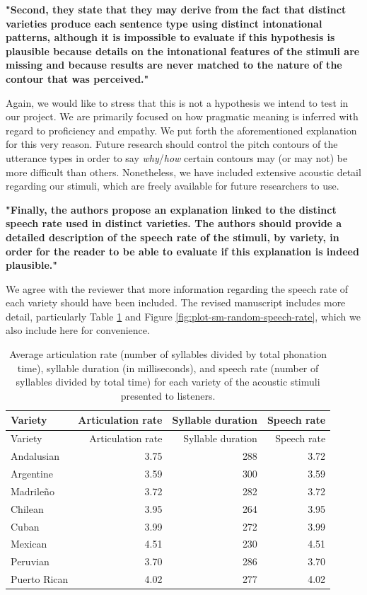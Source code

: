 \documentclass[]{article}
\begin{document}
\textbf{"Second, they state that they may derive from the fact that distinct varieties produce each sentence type using distinct intonational patterns, although it is impossible to evaluate if this hypothesis is plausible because details on the intonational features of the stimuli are missing and because results are never matched to the nature of the contour that was perceived."}

Again, we would like to stress that this is not a hypothesis we intend to test in our project.
We are primarily focused on how pragmatic meaning is inferred with regard to proficiency and empathy.
We put forth the aforementioned explanation for this very reason.
Future research should control the pitch contours of the utterance types in order to say \emph{why}/\emph{how} certain contours may (or may not) be more difficult than others.
Nonetheless, we have included extensive acoustic detail regarding our stimuli, which are freely available for future researchers to use.

\textbf{"Finally, the authors propose an explanation linked to the distinct speech rate used in distinct varieties. The authors should provide a detailed description of the speech rate of the stimuli, by variety, in order for the reader to be able to evaluate if this explanation is indeed plausible."}

We agree with the reviewer that more information regarding the speech rate of each variety should have been included.
The revised manuscript includes more detail, particularly Table \ref{tab:table-stimuli-sr} and Figure \ref{fig:plot-sm-random-speech-rate}, which we also include here for convenience.

\begin{longtable}[]{@{}lrrr@{}}
\caption{\label{tab:table-stimuli-sr}Average articulation rate (number of syllables divided by total
phonation time), syllable duration (in milliseconds), and speech rate (number
of syllables divided by total time) for each variety of the acoustic stimuli
presented to listeners.}\tabularnewline
\toprule()
Variety & Articulation rate & Syllable duration & Speech rate \\
\midrule()
\endfirsthead
\toprule()
Variety & Articulation rate & Syllable duration & Speech rate \\
\midrule()
\endhead
Andalusian & 3.75 & 288 & 3.72 \\
Argentine & 3.59 & 300 & 3.59 \\
Madrileño & 3.72 & 282 & 3.72 \\
Chilean & 3.95 & 264 & 3.95 \\
Cuban & 3.99 & 272 & 3.99 \\
Mexican & 4.51 & 230 & 4.51 \\
Peruvian & 3.70 & 286 & 3.70 \\
Puerto Rican & 4.02 & 277 & 4.02 \\
\bottomrule()
\end{longtable}
\end{document}
